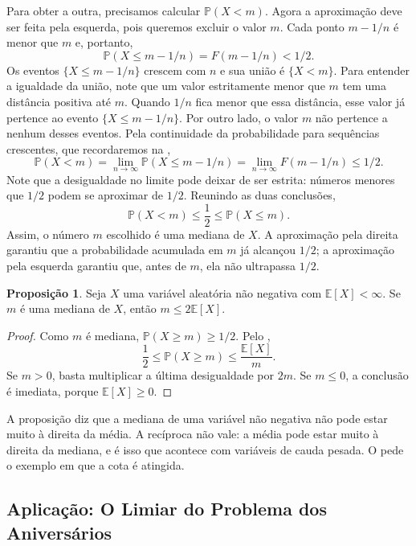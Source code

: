 \documentclass[12pt,portuguese]{article}
\theoremstyle{definition}
\newtheorem{proposition}[proposition]{Proposição}
\theoremstyle{plainexercise}
\theoremstyle{starredexercise}
\theoremstyle{definition}
\begin{document}
Para obter a outra, precisamos calcular $\mathbb{P}(X<m)$. Agora a
aproximação deve ser feita pela esquerda, pois queremos excluir o valor
$m$. Cada ponto $m-1/n$ é menor que $m$ e, portanto,
\[
\mathbb{P}(X\leqslant m-1/n)=F(m-1/n)<1/2.
\]
Os eventos $\{X\leqslant m-1/n\}$ crescem com $n$ e sua união é
$\{X<m\}$. Para entender a igualdade da união, note que um valor
estritamente menor que $m$ tem uma distância positiva até $m$.
Quando $1/n$ fica menor que essa distância, esse valor já pertence ao
evento $\{X\leqslant m-1/n\}$. Por outro lado, o valor $m$ não pertence
a nenhum desses eventos. Pela continuidade da probabilidade para
sequências crescentes, que recordaremos na ,
\[
\mathbb{P}(X<m)
=\lim_{n\to\infty}\mathbb{P}(X\leqslant m-1/n)
=\lim_{n\to\infty}F(m-1/n)\leqslant1/2.
\]
Note que a desigualdade no limite pode deixar de ser estrita: números
menores que $1/2$ podem se aproximar de $1/2$. Reunindo as duas conclusões,
\[
\mathbb{P}(X<m)\leqslant\frac12
\leqslant\mathbb{P}(X\leqslant m).
\]
Assim, o número $m$ escolhido é uma mediana de $X$. A aproximação pela
direita garantiu que a probabilidade acumulada em $m$ já alcançou $1/2$;
a aproximação pela esquerda garantiu que, antes de $m$, ela não ultrapassa
$1/2$.

\begin{proposition}\label{prop:mediana-markov}
Seja $X$ uma variável aleatória não negativa com $\mathbb{E}[X]<\infty$. Se
$m$ é uma mediana de $X$, então $m\leqslant2\mathbb{E}[X]$.
\end{proposition}

\begin{proof}
Como $m$ é mediana, $\mathbb{P}(X\geqslant m)\geqslant1/2$. Pelo
,
\[
\frac{1}{2}\leqslant\mathbb{P}(X\geqslant m)\leqslant\frac{\mathbb{E}[X]}{m}.
\]
Se $m>0$, basta multiplicar a última desigualdade por $2m$.
Se $m\leqslant0$, a conclusão é imediata, porque $\mathbb{E}[X]\geqslant0$.
\end{proof}

A proposição diz que a mediana de uma variável não negativa não pode estar
muito à direita da média. A recíproca não vale: a média pode estar muito à
direita da mediana, e é isso que acontece com variáveis de cauda pesada. O
 pede o exemplo em que a cota é atingida.

\subsection{Aplicação: O Limiar do Problema dos Aniversários}\label{subsec:aniversarios}
\end{document}
